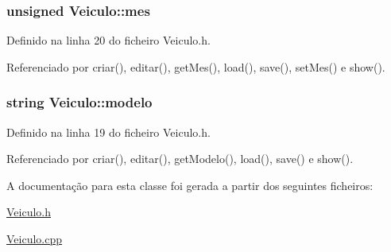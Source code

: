 \hypertarget{class_veiculo_ac4146f7b3d38e31e3225074e0fb0dea9}{
\subsubsection[{mes}]{\setlength{\rightskip}{0pt plus 5cm}unsigned Veiculo\+::mes\hspace{0.3cm}{\ttfamily [private]}}}\label{class_veiculo_ac4146f7b3d38e31e3225074e0fb0dea9}


Definido na linha 20 do ficheiro Veiculo.\+h.



Referenciado por criar(), editar(), get\+Mes(), load(), save(), set\+Mes() e show().

\hypertarget{class_veiculo_a313c15811b7fffa4787eea0dcf12fc13}{
\subsubsection[{modelo}]{\setlength{\rightskip}{0pt plus 5cm}string Veiculo\+::modelo\hspace{0.3cm}{\ttfamily [private]}}}\label{class_veiculo_a313c15811b7fffa4787eea0dcf12fc13}


Definido na linha 19 do ficheiro Veiculo.\+h.



Referenciado por criar(), editar(), get\+Modelo(), load(), save() e show().



A documentação para esta classe foi gerada a partir dos seguintes ficheiros\+:\begin{DoxyCompactItemize}
\item 
\hyperlink{_veiculo_8h}{Veiculo.\+h}\item 
\hyperlink{_veiculo_8cpp}{Veiculo.\+cpp}\end{DoxyCompactItemize}
